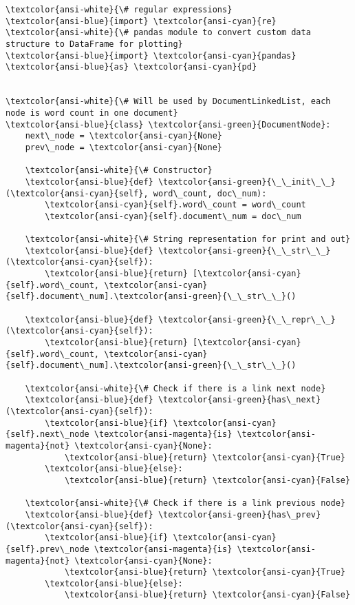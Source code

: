 \documentclass[11pt]{article}
\begin{document}
    \begin{Verbatim}[commandchars=\\\{\}]
\textcolor{ansi-white}{\# regular expressions}
\textcolor{ansi-blue}{import} \textcolor{ansi-cyan}{re}
\textcolor{ansi-white}{\# pandas module to convert custom data structure to DataFrame for plotting}
\textcolor{ansi-blue}{import} \textcolor{ansi-cyan}{pandas} \textcolor{ansi-blue}{as} \textcolor{ansi-cyan}{pd}


\textcolor{ansi-white}{\# Will be used by DocumentLinkedList, each node is word count in one document}
\textcolor{ansi-blue}{class} \textcolor{ansi-green}{DocumentNode}:
    next\_node = \textcolor{ansi-cyan}{None}
    prev\_node = \textcolor{ansi-cyan}{None}

    \textcolor{ansi-white}{\# Constructor}
    \textcolor{ansi-blue}{def} \textcolor{ansi-green}{\_\_init\_\_}(\textcolor{ansi-cyan}{self}, word\_count, doc\_num):
        \textcolor{ansi-cyan}{self}.word\_count = word\_count
        \textcolor{ansi-cyan}{self}.document\_num = doc\_num

    \textcolor{ansi-white}{\# String representation for print and out}
    \textcolor{ansi-blue}{def} \textcolor{ansi-green}{\_\_str\_\_}(\textcolor{ansi-cyan}{self}):
        \textcolor{ansi-blue}{return} [\textcolor{ansi-cyan}{self}.word\_count, \textcolor{ansi-cyan}{self}.document\_num].\textcolor{ansi-green}{\_\_str\_\_}()

    \textcolor{ansi-blue}{def} \textcolor{ansi-green}{\_\_repr\_\_}(\textcolor{ansi-cyan}{self}):
        \textcolor{ansi-blue}{return} [\textcolor{ansi-cyan}{self}.word\_count, \textcolor{ansi-cyan}{self}.document\_num].\textcolor{ansi-green}{\_\_str\_\_}()

    \textcolor{ansi-white}{\# Check if there is a link next node}
    \textcolor{ansi-blue}{def} \textcolor{ansi-green}{has\_next}(\textcolor{ansi-cyan}{self}):
        \textcolor{ansi-blue}{if} \textcolor{ansi-cyan}{self}.next\_node \textcolor{ansi-magenta}{is} \textcolor{ansi-magenta}{not} \textcolor{ansi-cyan}{None}:
            \textcolor{ansi-blue}{return} \textcolor{ansi-cyan}{True}
        \textcolor{ansi-blue}{else}:
            \textcolor{ansi-blue}{return} \textcolor{ansi-cyan}{False}

    \textcolor{ansi-white}{\# Check if there is a link previous node}
    \textcolor{ansi-blue}{def} \textcolor{ansi-green}{has\_prev}(\textcolor{ansi-cyan}{self}):
        \textcolor{ansi-blue}{if} \textcolor{ansi-cyan}{self}.prev\_node \textcolor{ansi-magenta}{is} \textcolor{ansi-magenta}{not} \textcolor{ansi-cyan}{None}:
            \textcolor{ansi-blue}{return} \textcolor{ansi-cyan}{True}
        \textcolor{ansi-blue}{else}:
            \textcolor{ansi-blue}{return} \textcolor{ansi-cyan}{False}



\end{Verbatim}
\end{document}
